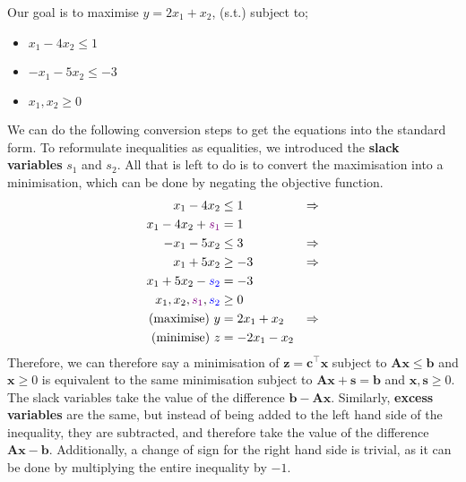 \documentclass[a4paper, 12pt]{article}
\newcommand{\mat}[1]{\boldsymbol{#1}}
\renewcommand{\vec}[1]{\boldsymbol{#1}}
\newcommand{\violet}[1]{\textcolor{violet}{#1}}
\newcommand{\blue}[1]{\textcolor{blue}{#1}}
\begin{document}
                Our goal is to maximise $y = 2x_1 + x_2$, (s.t.) subject to;
                \begin{itemize}
                    \itemsep0em
                    \item $x_1 - 4x_2 \leq 1$
                    \item $-x_1 - 5x_2 \leq -3$
                    \item $x_1, x_2 \geq 0$
                \end{itemize}
                We can do the following conversion steps to get the equations into the standard form.
                To reformulate inequalities as equalities, we introduced the \textbf{slack variables} $s_1$ and $s_2$.
                All that is left to do is to convert the maximisation into a minimisation, which can be done by negating the objective function.
                \begin{align*}
                    x_1 - 4x_2 & \leq 1 & \Rightarrow \\
                    x_1 - 4x_2 + \violet{s_1} & = 1 \\
                    -x_1 - 5x_2 & \leq 3 & \Rightarrow \\
                    x_1 + 5x_2 & \geq -3 & \Rightarrow \\
                    x_1 + 5x_2 - \blue{s_2} & = -3 \\
                    x_1, x_2, \violet{s_1}, \blue{s_2} & \geq 0 \\
                    \text{(maximise) } y & = 2x_1 + x_2 & \Rightarrow \\
                    \text{(minimise) } z & = -2x_1 - x_2
                \end{align*}
                Therefore, we can therefore say a minimisation of $\vec{z} = \vec{c}^\top\vec{x}$ subject to $\mat{A}\vec{x} \leq \vec{b}$ and $\vec{x} \geq 0$ is equivalent to the same minimisation subject to $\mat{A}\vec{x} + \vec{s} = \vec{b}$ and $\vec{x}, \vec{s} \geq 0$.
                The slack variables take the value of the difference $\vec{b} - \mat{A}\vec{x}$.
                Similarly, \textbf{excess variables} are the same, but instead of being added to the left hand side of the inequality, they are subtracted, and therefore take the value of the difference $\mat{A}\vec{x} - \vec{b}$.
                Additionally, a change of sign for the right hand side is trivial, as it can be done by multiplying the entire inequality by $-1$.
\end{document}
